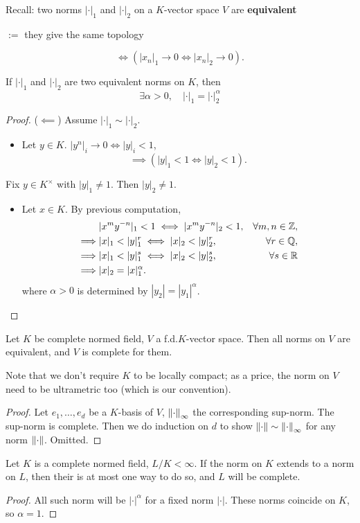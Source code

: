 Recall: two norms $|\cdot|_1$ and $|\cdot|_2$
on a $K$-vector space $V$ are \textbf{equivalent} \begin{center}
    $:=$ they give the same topology
\end{center}\[\iff (|x_n|_1\to 0\iff |x_n|_2\to 0).\]
\begin{proposition}
    If $|\cdot|_1$ and $|\cdot|_2$ are two equivalent norms on $K$, then \[\exists\alpha > 0,\quad |\cdot|_1 = |\cdot|_2^\alpha\]
\end{proposition}
\begin{proof}
    ($\impliedby$) Assume $|\cdot|_1\sim|\cdot|_2$.
    \begin{itemize}
\item Let $y\in K$. $|y^n|_i\to 0\iff |y|_i < 1$,
\[\implies \left( |y|_1 < 1\iff |y|_2 < 1 \right).\]
    \end{itemize}
Fix $y\in K^\times$ with $|y|_1\ne 1$. Then $|y|_2\ne 1$.
\begin{itemize}
    \item Let $x\in K$.
    By previous computation, 
    \begin{align*}
        &{} |x^my^{-n}|_1 < 1\iff |x^my^{-n}|_2 < 1, &\forall m, n\in\mathbb{Z},\\
    \implies &{} |x|_1 < |y|_1^{r}\iff |x|_2 < |y|_2^{r}, &\forall r\in\mathbb{Q},\\
    \implies &{} |x|_1 < |y|_1^{s}\iff |x|_2 < |y|_2^{s}, &\forall s\in\mathbb{R}\\
    \implies &{} |x|_2 = |x|_1^{\alpha}. &
    \end{align*}
    where $\alpha > 0$ is determined by $|y_2| = |y_1|^\alpha$.\qedhere
\end{itemize}
\end{proof}
\begin{theorem}[Artin]
    Let $K$ be complete normed field, $V$ a f.d.$K$-vector space.
    Then all norms on $V$ are equivalent, and $V$ is complete for them.
\end{theorem}
Note that we don't require $K$ to be locally compact; as a price, the norm on $V$ need to be ultrametric too (which is our convention).
\begin{proof}
    Let $e_1, \dots, e_d$ be a $K$-basis of $V$, $\left\| \cdot\right\|_{\infty}$ the corresponding sup-norm. The sup-norm is complete.
    Then we do induction on $d$ to show $\left\| \cdot\right\|\sim \left\| \cdot\right\|_{\infty}$ for any norm $\left\| \cdot\right\|$. Omitted.
\end{proof}

\begin{corollary}
    Let $K$ is a complete normed field, $L/K < \infty$. If the norm on $K$ extends to a norm on $L$, then their is at most one way to do so, and $L$ will be complete.
\end{corollary}
\begin{proof}
    All such norm will be $|\cdot|^\alpha$ for a fixed norm $|\cdot|$.
    These norms coincide on $K$, so $\alpha = 1$.
\end{proof}

